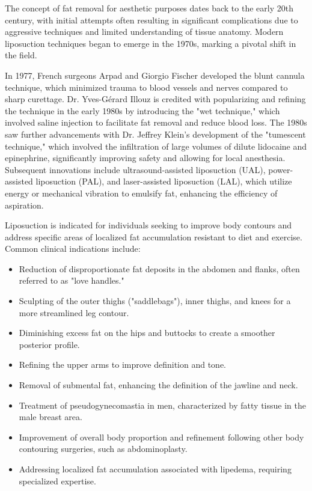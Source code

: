 The concept of fat removal for aesthetic purposes dates back to the early 20th century, with initial attempts often resulting in significant complications due to aggressive techniques and limited understanding of tissue anatomy. Modern liposuction techniques began to emerge in the 1970s, marking a pivotal shift in the field.

In 1977, French surgeons Arpad and Giorgio Fischer developed the blunt cannula technique, which minimized trauma to blood vessels and nerves compared to sharp curettage. Dr. Yves-G\'{e}rard Illouz is credited with popularizing and refining the technique in the early 1980s by introducing the "wet technique," which involved saline injection to facilitate fat removal and reduce blood loss. The 1980s saw further advancements with Dr. Jeffrey Klein's development of the "tumescent technique," which involved the infiltration of large volumes of dilute lidocaine and epinephrine, significantly improving safety and allowing for local anesthesia. Subsequent innovations include ultrasound-assisted liposuction (UAL), power-assisted liposuction (PAL), and laser-assisted liposuction (LAL), which utilize energy or mechanical vibration to emulsify fat, enhancing the efficiency of aspiration.

Liposuction is indicated for individuals seeking to improve body contours and address specific areas of localized fat accumulation resistant to diet and exercise. Common clinical indications include:

\begin{itemize}
  \item Reduction of disproportionate fat deposits in the abdomen and flanks, often referred to as "love handles."
  \item Sculpting of the outer thighs ("saddlebags"), inner thighs, and knees for a more streamlined leg contour.
  \item Diminishing excess fat on the hips and buttocks to create a smoother posterior profile.
  \item Refining the upper arms to improve definition and tone.
  \item Removal of submental fat, enhancing the definition of the jawline and neck.
  \item Treatment of pseudogynecomastia in men, characterized by fatty tissue in the male breast area.
  \item Improvement of overall body proportion and refinement following other body contouring surgeries, such as abdominoplasty.
  \item Addressing localized fat accumulation associated with lipedema, requiring specialized expertise.
\end{itemize}

